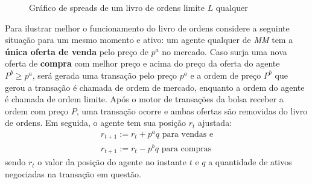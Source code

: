 \begin{figure}
	\begin{center}
	\end{center}
	\caption{Gráfico de spreads de um livro de ordens limite $L$ qualquer}
\end{figure}

Para ilustrar melhor o funcionamento do livro de ordens considere a seguinte situação para um mesmo momento e ativo: um agente qualquer de \textit{MM} tem a \textbf{única oferta de venda} pelo preço de $p^{a}$ no mercado. Caso surja uma nova oferta de \textbf{compra} com melhor preço e acima do preço da oferta do agente $P^{b} \geq p^{a}$, será gerada uma transação pelo preço $p^{a}$ e a ordem de preço $P^{b}$ que gerou a transação é chamada de ordem de mercado, enquanto a ordem do agente é chamada de ordem limite. Após o motor de transações da bolsa receber a ordem com preço $P$, uma transação ocorre e ambas ofertas são removidas do livro de ordens. Em seguida, o agente tem sua posição $r_{t}$ ajustada:
\begin{equation}
    \begin{aligned}
    	r_{t + 1}:= r_{t} + p^{a}q \text{ para vendas e} \\ 
    	r_{t + 1}:= r_{t} - p^{b}q \text{ para compras}
    \end{aligned}
\end{equation}
sendo $r_{t}$ o valor da posição do agente no instante $t$ e $q$ a quantidade de ativos negociadas na transação em questão.

